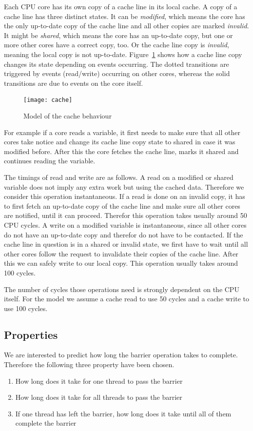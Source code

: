 \documentclass[a4paper, 10pt]{article}
\begin{document}
Each CPU core has its own copy of a cache line in its local cache. A copy of a cache line has three distinct states. It can be \emph{modified}, which means the core has the only up-to-date copy of the cache line and all other copies are marked \emph{invalid}. It might be \emph{shared}, which means the core has an up-to-date copy, but one or more other cores have a correct copy, too. Or the cache line copy is \emph{invalid}, meaning the local copy is not up-to-date. Figure~\ref{fig:cache} shows how a cache line copy changes its state depending on events occurring. The dotted transitions are triggered by events (read/write) occurring on other cores, whereas the solid transitions are due to events on the core itself.
\begin{figure}[htbp]
	\centering
	\texttt{[image: cache]}
	\caption{Model of the cache behaviour}
	\label{fig:cache}
\end{figure}

For example if a core reads a variable, it first needs to make sure that all other cores take notice and change its cache line copy state to shared in case it was modified before. After this the core fetches the cache line, marks it shared and continues reading the variable.

The timings of read and write are as follows. A read on a modified or shared variable does not imply any extra work but using the cached data. Therefore we consider this operation instantaneous. If a read is done on an invalid copy, it has to first fetch an up-to-date copy of the cache line and make sure all other cores are notified, until it can proceed. Therefor this operation takes usually around 50 CPU cycles. A write on a modified variable is instantaneous, since all other cores do not have an up-to-date copy and therefor do not have to be contacted. If the cache line in question is in a shared or invalid state, we first have to wait until all other cores follow the request to invalidate their copies of the  cache line. After this we can safely write to our local copy. This operation usually takes around 100 cycles.

The number of cycles those operations need is strongly dependent on the CPU itself. For the model we assume a cache read to use 50 cycles and a cache write to use 100 cycles.
\subsection{Properties}
We are interested to predict how long the barrier operation takes to complete. Therefore the following three property have been chosen.
\begin{enumerate}
	\item How long does it take for one thread to pass the barrier
	\item How long does it take for all threads to pass the barrier
	\item If one thread has left the barrier, how long does it take until all of them complete the barrier
\end{enumerate}
\end{document}
